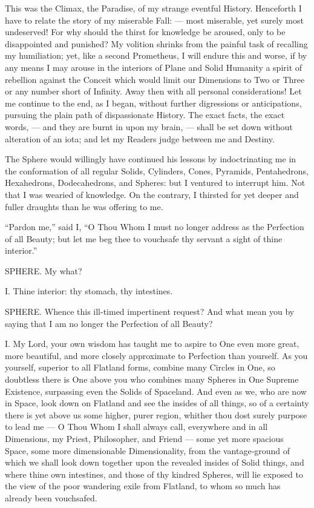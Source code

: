 \documentclass[12pt, a4paper, oneside]{memoir}
\begin{document}
This was the Climax, the Paradise, of my strange eventful History. Henceforth
I have to relate the story of my miserable Fall: --- most miserable, yet surely
most undeserved! For why should the thirst for knowledge be aroused, only to
be disappointed and punished? My volition shrinks from the painful task of
recalling my humiliation; yet, like a second Prometheus, I will endure this
and worse, if by any means I may arouse in the interiors of Plane and Solid
Humanity a spirit of rebellion against the Conceit which would limit our
Dimensions to Two or Three or any number short of Infinity. Away then with all
personal considerations! Let me continue to the end, as I began, without
further digressions or anticipations, pursuing the plain path of dispassionate
History. The exact facts, the exact words, --- and they are burnt in upon my
brain, --- shall be set down without alteration of an iota; and let my Readers
judge between me and Destiny.

The Sphere would willingly have continued his lessons by indoctrinating me in
the conformation of all regular Solids, Cylinders, Cones, Pyramids,
Pentahedrons, Hexahedrons, Dodecahedrons, and Spheres: but I ventured to
interrupt him. Not that I was wearied of knowledge.  On the contrary, I
thirsted for yet deeper and fuller draughts than he was offering to me.

``Pardon me,'' said I, ``O Thou Whom I must no longer address as the Perfection
of all Beauty; but let me beg thee to vouchsafe thy servant a sight of thine
interior.''

SPHERE. My what?

I. Thine interior: thy stomach, thy intestines.

SPHERE. Whence this ill-timed impertinent request? And what mean you by saying
that I am no longer the Perfection of all Beauty?

I. My Lord, your own wisdom has taught me to aspire to One even more great,
more beautiful, and more closely approximate to Perfection than yourself. As
you yourself, superior to all Flatland forms, combine many Circles in One, so
doubtless there is One above you who combines many Spheres in One Supreme
Existence, surpassing even the Solids of Spaceland. And even as we, who are
now in Space, look down on Flatland and see the insides of all things, so of a
certainty there is yet above us some higher, purer region, whither thou dost
surely purpose to lead me --- O Thou Whom I shall always call, everywhere and in
all Dimensions, my Priest, Philosopher, and Friend --- some yet more spacious
Space, some more dimensionable Dimensionality, from the vantage-ground of
which we shall look down together upon the revealed insides of Solid things,
and where thine own intestines, and those of thy kindred Spheres, will lie
exposed to the view of the poor wandering exile from Flatland, to whom so much
has already been vouchsafed.
\end{document}
